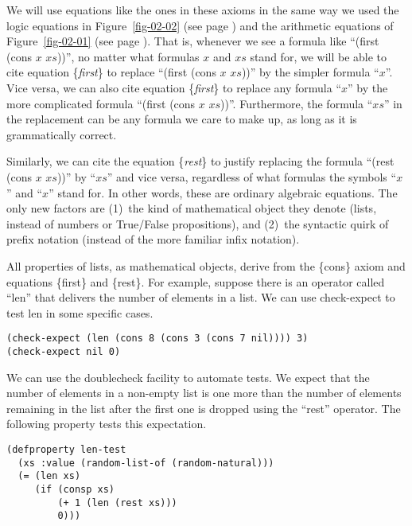 We will use equations like the ones in these axioms in the same way we used the logic equations in Figure~\ref{fig-02-02} (see page \pageref{fig-02-02}) and the arithmetic equations of Figure~\ref{fig-02-01} (see page \pageref{fig-02-01}). That is, whenever we see a formula like ``(first (cons $x$ $xs$))'', no matter what formulas $x$ and $xs$ stand for, we will be able to cite equation \{\emph{first}\} to replace ``(first (cons $x$ $xs$))'' by the simpler formula ``$x$''. Vice versa, we can also cite equation \{\emph{first}\} to replace any formula ``$x$'' by the more complicated formula ``(first (cons $x$ $xs$))''. Furthermore, the formula ``$xs$'' in the replacement can be any formula we care to make up, as long as it is grammatically correct.

Similarly, we can cite the equation \{\emph{rest}\} to justify replacing the formula ``(rest (cons $x$ $xs$))'' by ``$xs$'' and vice versa, regardless of what formulas the symbols ``$x$'' and ``$x$'' stand for. In other words, these are ordinary algebraic equations. The only new factors are
(1)~the kind of mathematical object they denote (lists, instead of numbers or True/False propositions), and
(2)~the syntactic quirk of prefix notation (instead of the more familiar infix notation).

All properties of lists, as mathematical objects, derive from the \{cons\} axiom and equations \{first\} and \{rest\}. For example, suppose there is an operator called ``len'' that delivers the number of elements in a list. We can use check-expect to test len in some specific cases.

\begin{lstlisting}
(check-expect (len (cons 8 (cons 3 (cons 7 nil)))) 3)
(check-expect nil 0)
\end{lstlisting}

We can use the doublecheck facility to automate tests. We expect that the number of elements in a non-empty list is one more than the number of elements remaining in the list after the first one is dropped using the ``rest'' operator. The following property tests this expectation.

\begin{lstlisting}
(defproperty len-test
  (xs :value (random-list-of (random-natural)))
  (= (len xs)
     (if (consp xs)
         (+ 1 (len (rest xs)))
         0)))
\end{lstlisting}

